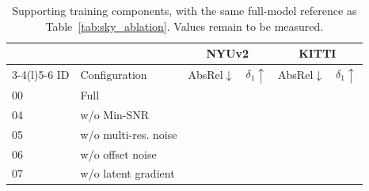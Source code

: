 \begin{table}[!t]
	\centering
	\caption{Supporting training components, with the same full-model reference as Table~\ref{tab:sky_ablation}. Values remain to be measured.}
	\label{tab:training_ablation}
	\setlength{\tabcolsep}{3pt}
	\footnotesize
	\begin{tabular}{@{}llrrrr@{}}
		\toprule
		   &                      & \multicolumn{2}{c}{NYUv2} & \multicolumn{2}{c}{KITTI}                                           \\
		\cmidrule(lr){3-4}\cmidrule(l){5-6}
		ID & Configuration        & AbsRel$\downarrow$        & $\delta_1\uparrow$        & AbsRel$\downarrow$ & $\delta_1\uparrow$ \\
		\midrule
		00 & Full                 & \pending                  & \pending                  & \pending           & \pending           \\
		04 & w/o Min-SNR          & \pending                  & \pending                  & \pending           & \pending           \\
		05 & w/o multi-res. noise & \pending                  & \pending                  & \pending           & \pending           \\
		06 & w/o offset noise     & \pending                  & \pending                  & \pending           & \pending           \\
		07 & w/o latent gradient  & \pending                  & \pending                  & \pending           & \pending           \\
		\bottomrule
	\end{tabular}
\end{table}
